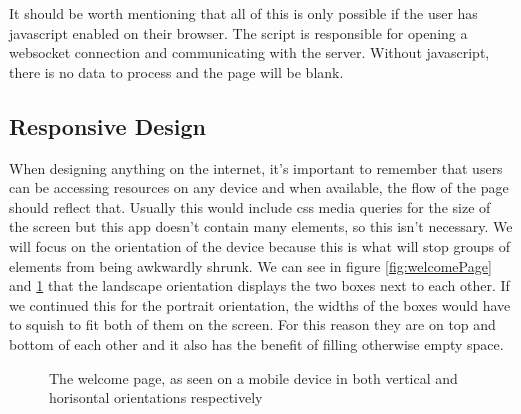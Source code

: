 It should be worth mentioning that all of this is only possible if the user has javascript enabled on their browser. The script is responsible for opening a websocket connection and communicating with the server. Without javascript, there is no data to process and the page will be blank.

\subsection{Responsive Design}


When designing anything on the internet, it's important to remember that users can be accessing resources on any device and when available, the flow of the page should reflect that. Usually this would include css media queries for the size of the screen but this app doesn't contain many elements, so this isn't necessary. We will focus on the orientation of the device because this is what will stop groups of elements from being awkwardly shrunk. We can see in figure \ref{fig:welcomePage} and \ref{fig:responsiveDesign} that the landscape orientation displays the two boxes next to each other. If we continued this for the portrait orientation, the widths of the boxes would have to squish to fit both of them on the screen. For this reason they are on top and bottom of each other and it also has the benefit of filling otherwise empty space.

\begin{figure}
    \begin{center}
        \captionsetup{justification=centering}

        \hspace{1cm}
        \caption{The welcome page, as seen on a mobile device in both vertical and horisontal orientations respectively}
        \label{fig:responsiveDesign}
    \end{center}
\end{figure}

